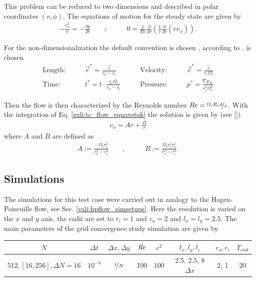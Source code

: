 This problem can be reduced to two dimensions and described in polar coordinates $(r, \phi)$. The equations of motion for the steady state are given by \citep{Kundu2012}
\begin{align}
    \label{vali:tc_flow_eqnavstok}
    -\frac{v^2_\phi}{r} = - \frac{\partial p}{\partial r} \qquad ;& \qquad 0 = \frac{1}{Re}\frac{\partial}{\partial r}\left(\frac{1}{r}\frac{\partial}{\partial r}(r v_\phi)\right).
\end{align}

\clearpage

For the non-dimensionalization the default convention is chosen , according to  \citep{Chen2015}, is chosen
\begin{align}
    \text{Length:}\qquad &  \vec{r}^* = \frac{\vec{r}}{r_o - r_i}  &
    \qquad \text{Velocity:}\qquad& \vec{v}^* =  \frac{\vec{v}}{r_i\Omega_i}\\
    \text{Time:}  \qquad & t^* = t \cdot \frac{r_i \Omega_i}{r_o - r_i}&
    \qquad  \text{Pressure:}\qquad & p^* = \frac{\nabla p_\infty}{r_i^2\Omega_i^2}
\end{align}


Then the flow is then characterized by the Reynolds number $Re = \nicefrac{\Omega_i R_i d}{\nu}$.
With the integration of Eq. \ref{vali:tc_flow_eqnavstok} the solution is given by (see [\citep{Kundu2012}])
\begin{align}
    v_\phi = Ar + \frac{B}{r}
\end{align}
where $A$ and $B$ are defined as
\begin{align}
    A := \frac{-\Omega_i r_i^2}{r^2_o - r^2_i} \qquad ,& \qquad B := \frac{\Omega_i r^2_i r^2_o}{r^2_o - r^2_i}.
\end{align}

\subsection{Simulations}


The simulations for this test case were carried out in analogy to the Hagen-Poiseuille flow, see Sec. \ref{vali:hpflow_simsetups}.
Here the resolution is varied on the $x$ and $y$ axis, the radii are set to $r_i=1$ and $r_o=2$ and $l_x=l_y=2.5$.
The main parameters of the grid convergence study simulation are  given by

\begin{center}
\vspace*{0.7ex}
\begin{tabular}{c|c|c|c|c|c|c|c }
 $ N  $                   & $\Delta t$ & $\Delta x, \Delta y$            & $\mbox{\textit{Re}}$  & $c^2$   & $l_x, l_y, l_z$ & $r_o, r_i$ & $T_{end}$\\
\hline
 $512, [16, 256], \Delta N = 16 $& $10^{-4}$ & $\nicefrac{1}{N}$ & 100     & $100$   & 2.5, 2.5, 8$\Delta x$ & 2, 1    & 20\\
\end{tabular}
\vspace*{0.7ex}
\end{center}

